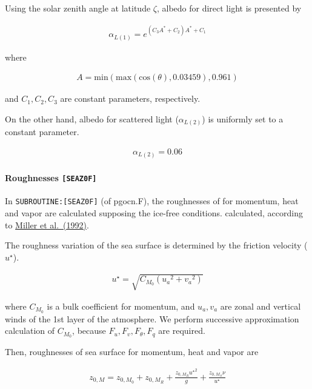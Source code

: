 Using the solar zenith angle at latitude \(\zeta\), albedo for direct
light is presented by

\begin{eqnarray}
    \alpha_{L(1)} = e^{(C_3A^* + C_2) A^* +C_1}
\end{eqnarray}

where

\begin{eqnarray}
    A = \mathrm{min}(\mathrm{max}(\mathrm{cos}(\theta),0.03459),0.961)
\end{eqnarray}

and \(C_1,C_2,C_3\) are constant parameters, respectively.

On the other hand, albedo for scattered light (\(\alpha_{L(2)}\)) is
uniformly set to a constant parameter.

\begin{eqnarray}
    \alpha_{L(2)} = 0.06
\end{eqnarray}

\hypertarget{roughnesses-seaz0f}{%
\paragraph{\texorpdfstring{Roughnesses
\texttt{{[}SEAZ0F{]}}}{Roughnesses {[}SEAZ0F{]}}}\label{roughnesses-seaz0f}}

In \texttt{SUBROUTINE:{[}SEAZ0F{]}} (of pgocn.F), the roughnesses of for
momentum, heat and vapor are calculated supposing the ice-free
conditions. calculated, according to
\href{https://journals.ametsoc.org/view/journals/clim/5/5/1520-0442_1992_005_0418_tsotem_2_0_co_2.xml}{Miller
et al.~(1992)}.

The roughness variation of the sea surface is determined by the friction
velocity (\(u^\star\)).

\begin{eqnarray}
u^{\star} = \sqrt{C_{M_0} ({u_a}^2  +{v_a}^2)}
\end{eqnarray}

where \(C_{M_0}\) is a bulk coefficient for momentum, and \(u_a,v_a\)
are zonal and vertical winds of the 1st layer of the atmosphere. We
perform successive approximation calculation of \({C_{M_0}}\), because
\(F_u,F_v,F_\theta,F_q\) are required.

Then, roughnesses of sea surface for momentum, heat and vapor are

\begin{eqnarray}
    z_{0,M} = z_{0,M_0} + z_{0,M_R} + \frac{z_{0,M_R} {u^\star }^2 }{g} + \frac{z_{0,M_S}\nu }{u^\star}
\end{eqnarray}

